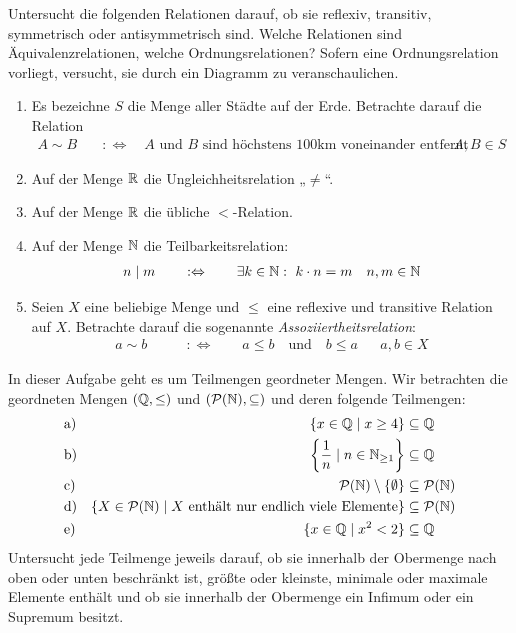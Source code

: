 \begin{aufg}
    Untersucht die folgenden Relationen darauf, ob sie reflexiv, transitiv, symmetrisch oder antisymmetrisch sind. Welche Relationen sind Äquivalenzrelationen, welche Ordnungsrelationen? Sofern eine Ordnungsrelation vorliegt, versucht, sie durch ein Diagramm zu veranschaulichen.
    \begin{enumerate}
        \item Es bezeichne $S$ die Menge aller Städte auf der Erde. Betrachte darauf die Relation
        \begin{align*}
            A \sim B \quad& :\Leftrightarrow\quad \text{$A$ und $B$ sind höchstens 100km voneinander entfernt} && A,B\in S
        \end{align*}
        \item Auf der Menge $\mathbb R$ die Ungleichheitsrelation „$\neq$“.
        \item Auf der Menge $\mathbb R$ die übliche $<$-Relation.
        \item Auf der Menge $\mathbb N$ die Teilbarkeitsrelation:
        \begin{align*}
            n\mid m \qquad:\Leftrightarrow\qquad \exists k\in \N:\ k\cdot n=m && n,m\in \N
        \end{align*}
        \item Seien $X$ eine beliebige Menge und $\le$ eine reflexive und transitive Relation auf $X$. Betrachte darauf die sogenannte \emph{Assoziiertheitsrelation}:
        \begin{align*}
            a\sim b \qquad&:\Leftrightarrow\qquad a\le b\quad\text{und}\quad b\le a && a,b\in X
        \end{align*}
    \end{enumerate}
\end{aufg}


\begin{aufg}[Schranken]
    In dieser Aufgabe geht es um Teilmengen geordneter Mengen. Wir betrachten die geordneten Mengen $(\mathbb Q,\le)$ und $(\mathcal P(\mathbb N),\subseteq)$ und deren folgende Teilmengen:
    \begin{align*}
        & \text{a)} & \{x\in \mathbb Q \mid x\ge 4\} & \subseteq \mathbb Q \\
        & \text{b)} & \left\{\frac{1}{n}\mid n\in \mathbb N_{\ge 1}\right\} & \subseteq \mathbb Q \\
        & \text{c)} & \mathcal P(\mathbb N)\setminus \{\emptyset\} & \subseteq \mathcal P(\mathbb N) \\
        & \text{d)} & \{X\in\mathcal P(\mathbb N)\mid X\ \text{enthält nur endlich viele Elemente}\} & \subseteq \mathcal P(\mathbb N) \\
        & \text{e)} & \{x\in \mathbb Q \mid x^2<2\} & \subseteq \mathbb Q
    \end{align*}
    Untersucht jede Teilmenge jeweils darauf, ob sie innerhalb der Obermenge nach oben oder unten beschränkt ist, größte oder kleinste, minimale oder maximale Elemente enthält und ob sie innerhalb der Obermenge ein Infimum oder ein Supremum besitzt.
\end{aufg}


